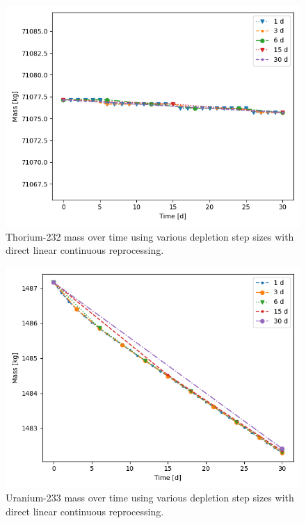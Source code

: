 \begin{figure}[H]
  \centering
  \includegraphics[scale=0.7]{images/DL_NSTEP_Th-232_mass.png}
  \caption{Thorium-232 mass over time using various depletion step sizes with direct linear continuous reprocessing.}
   \label{fig:DL-cont-th}
\end{figure}

\begin{figure}[H]
  \centering
  \includegraphics[scale=0.7]{images/DL_NSTEP_U-233_mass.png}
  \caption{Uranium-233 mass over time using various depletion step sizes with direct linear continuous reprocessing.}
   \label{fig:DL-cont-u}
\end{figure}

